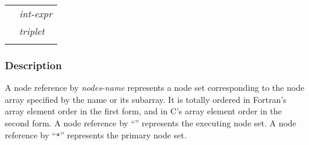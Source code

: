 \hspace{\hsize}

\begin{tabular}{ll}
 \hspace{0.5cm} & {\it int-expr} \\
 \hspace{0.5cm} & {\it triplet} \\
 \hspace{0.5cm} & {\tt *} \\
\end{tabular}


\subsubsection*{Description}


A node reference by {\it nodes-name} represents a node set corresponding
to the node array specified by the name or its subarray.
It is totally ordered in Fortran’s array element order in the first form, 
and in C’s array element order in the second form.
%
A node reference by ``{\tt *}''
represents the executing node set. A node reference by ``{\tt **}''
represents the primary node set.


